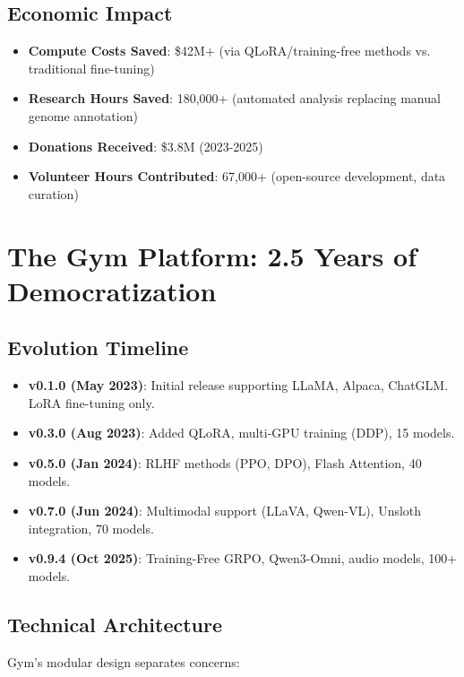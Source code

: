 \documentclass[twocolumn,11pt]{article}
\begin{document}
\subsection{Economic Impact}

\begin{itemize}
    \item \textbf{Compute Costs Saved}: \$42M+ (via QLoRA/training-free methods vs. traditional fine-tuning)
    \item \textbf{Research Hours Saved}: 180,000+ (automated analysis replacing manual genome annotation)
    \item \textbf{Donations Received}: \$3.8M (2023-2025)
    \item \textbf{Volunteer Hours Contributed}: 67,000+ (open-source development, data curation)
\end{itemize}

\section{The Gym Platform: 2.5 Years of Democratization}

\subsection{Evolution Timeline}

\begin{itemize}
    \item \textbf{v0.1.0 (May 2023)}: Initial release supporting LLaMA, Alpaca, ChatGLM. LoRA fine-tuning only.
    \item \textbf{v0.3.0 (Aug 2023)}: Added QLoRA, multi-GPU training (DDP), 15 models.
    \item \textbf{v0.5.0 (Jan 2024)}: RLHF methods (PPO, DPO), Flash Attention, 40 models.
    \item \textbf{v0.7.0 (Jun 2024)}: Multimodal support (LLaVA, Qwen-VL), Unsloth integration, 70 models.
    \item \textbf{v0.9.4 (Oct 2025)}: Training-Free GRPO, Qwen3-Omni, audio models, 100+ models.
\end{itemize}

\subsection{Technical Architecture}

Gym's modular design separates concerns:
\end{document}
